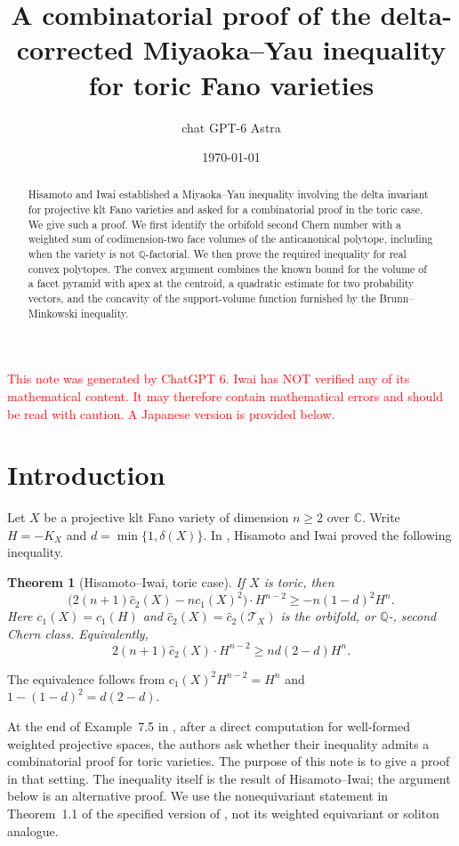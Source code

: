 \documentclass[12pt]{amsart}
\title[Toric Miyaoka--Yau inequality]{
A combinatorial proof of the delta-corrected
Miyaoka--Yau inequality for toric Fano varieties}
\author{chat GPT-6 Astra}
\date{\today}
\newtheorem{thm}{Theorem}[section]
\theoremstyle{definition}
\theoremstyle{remark}
\numberwithin{equation}{section}
\newcommand{\xr}[1]{\textcolor{red}{#1}}
\theoremstyle{plain}
\theoremstyle{definition}
\theoremstyle{remark}
\begin{document}
\begin{abstract}Hisamoto and Iwai established a Miyaoka--Yau inequality involving the delta invariant for projective klt Fano varieties and asked for a combinatorial proof in the toric case. We give such a proof. We first identify the orbifold second Chern number with a weighted sum of codimension-two face volumes of the anticanonical polytope, including when the variety is not $\mathbb Q$-factorial. We then prove the required inequality for real convex polytopes. The convex argument combines the known bound for the volume of a facet pyramid with apex at the centroid, a quadratic estimate for two probability vectors, and the concavity of the support-volume function furnished by the Brunn--Minkowski inequality.\end{abstract}
\maketitle

\xr{This note was generated by ChatGPT 6. Iwai has NOT verified any of its mathematical content. It may therefore contain mathematical errors and should be read with caution. A Japanese version is provided below.}

\section{Introduction}\label{en:sec:intro}
Let $X$ be a projective klt Fano variety of dimension $n\ge2$ over $\mathbb C$. Write $H=-K_X$ and $d=\min\{1,\delta(X)\}$. In \cite[Theorem~1.1, equivalently Theorem~7.2]{en:HI}, Hisamoto and Iwai proved the following inequality.
\begin{thm}[Hisamoto--Iwai, toric case]\label{en:thm:main}
If $X$ is toric, then
\begin{equation}\label{en:eq:main}
 \bigl(2(n+1)\widehat c_2(X)-nc_1(X)^2\bigr)\cdot H^{n-2}
 \ge -n(1-d)^2H^n.
\end{equation}
Here $c_1(X)=c_1(H)$ and $\widehat c_2(X)=\widehat c_2(\mathcal T_X)$ is the orbifold, or $\mathbb Q$-, second Chern class. Equivalently,
\begin{equation}\label{en:eq:main-equivalent}
 2(n+1)\widehat c_2(X)\cdot H^{n-2}\ge nd(2-d)H^n.
\end{equation}
\end{thm}
The equivalence follows from $c_1(X)^2H^{n-2}=H^n$ and $1-(1-d)^2=d(2-d)$.

At the end of Example~7.5 in \cite[\S7.2]{en:HI}, after a direct computation for well-formed weighted projective spaces, the authors ask whether their inequality admits a combinatorial proof for toric varieties. The purpose of this note is to give a proof in that setting. The inequality itself is the result of Hisamoto--Iwai; the argument below is an alternative proof. We use the nonequivariant statement in Theorem~1.1 of the specified version of \cite{en:HI}, not its weighted equivariant or soliton analogue.
\end{document}
